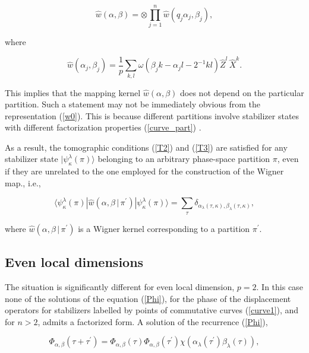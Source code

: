 \documentclass[quantumrep,article,submit,pdftex,moreauthors]{Definitions/mdpi}
\begin{document}
\begin{equation*}
  \hat{w}\left(\alpha,\beta\right)
  = \otimes \prod \limits_{j=1}^{n} \hat{w}
  \left( q_{j} \alpha_{j}, \beta_{j} \right),
\end{equation*}

where

\begin{equation*}
  \hat{w}(\alpha_{j}, \beta_{j})
  = \frac{1}{p} \sum_{k,l} \omega(\beta_{j} k - \alpha_{j} l -2^{-1} k l)
  \hat{Z}^{l} \,\hat{X}^{k}.
\end{equation*}

This implies that the mapping kernel $\hat{w}\left(\alpha,\beta\right)$ does not
depend on the particular partition. Such a statement may not be immediately
obvious from the representation (\ref{w0}). This is because different partitions
involve stabilizer states with different factorization properties
(\ref{curve_part}) \cite{Bjork2007}.

As a result, the tomographic conditions (\ref{T2}) and (\ref{T3}) are satisfied
for any stabilizer state $|\psi_{\kappa}^{\lambda}(\pi)\rangle$ belonging to an
arbitrary phase-space partition $\pi$, even if they are unrelated to the one
employed for the construction of the Wigner map., i.e.,

\begin{equation*}
  \langle \psi_{\kappa}^{\lambda}(\pi)
  |\hat{w}\left(\alpha,\beta \, | \, \pi^{\prime}\right)
  |\psi_{\kappa}^{\lambda}(\pi)\rangle
  = \sum_{\tau}
  \delta_{\alpha_{\lambda}(\tau,\kappa),\beta_{\lambda}(\tau,\kappa)},
\end{equation*}

where $\hat{w}\left(\alpha,\beta \, | \, \pi^{\prime}\right)$ is a Wigner
kernel corresponding to a partition $\pi^{\prime}$.

\subsection{Even local dimensions}

The situation is significantly different for even local dimension, $p=2$. In
this case none of the solutions of the equation (\ref{Phi}), for the phase
of the displacement operators for stabilizers labelled by points of
commutative curves (\ref{curve1}), and for $n > 2$, admits a factorized form. A
solution of the recurrence (\ref{Phi}),

\begin{equation}
  \Phi_{\alpha,\beta}\left(\tau + \tau^{\prime}\right)
  = \Phi_{\alpha,\beta}(\tau) \Phi_{\alpha,\beta }(\tau^{\prime})
  \chi \left(
    \alpha_{\lambda }(\tau^{\prime}) \beta_{\lambda}(\tau)
  \right),
  \label{phase 2}
\end{equation}
\end{document}
